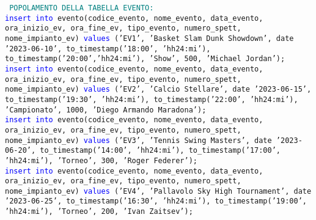 \documentclass{article}
\begin{document}
    \newpage
    \begin{flushleft}
        \texttt{
        \textcolor{teal}{POPOLAMENTO DELLA TABELLA EVENTO:} \\
        \hspace*{0.5em}\textcolor{blue}{insert into} evento(codice\_evento, nome\_evento, data\_evento, ora\_inizio\_ev, \hspace*{0.5em}ora\_fine\_ev, tipo\_evento, numero\_spett, nome\_impianto\_ev) \textcolor{blue}{values} ('EV1', 'Basket \hspace*{0.5em}Slam Dunk Showdown', date '2023-06-10', to\_timestamp('18:00', 'hh24:mi'), \hspace*{0.5em}to\_timestamp('20:00','hh24:mi'), 'Show', 500, 'Michael Jordan'); \\
        \vspace{2mm}
        \hspace*{0.5em}\textcolor{blue}{insert into} evento(codice\_evento, nome\_evento, data\_evento, ora\_inizio\_ev, \hspace*{0.5em}ora\_fine\_ev, tipo\_evento, numero\_spett, nome\_impianto\_ev) \textcolor{blue}{values} ('EV2', 'Calcio \hspace*{0.5em}Stellare', date '2023-06-15', to\_timestamp('19:30', 'hh24:mi'), \hspace*{0.5em}to\_timestamp('22:00', 'hh24:mi'), 'Campionato', 1000, 'Diego Armando Maradona'); \\
        \vspace{2mm}
        \hspace*{0.5em}\textcolor{blue}{insert into} evento(codice\_evento, nome\_evento, data\_evento, ora\_inizio\_ev, \hspace*{0.5em}ora\_fine\_ev, tipo\_evento, numero\_spett, nome\_impianto\_ev) \textcolor{blue}{values} ('EV3', 'Tennis \hspace*{0.5em}Swing Masters', date '2023-06-20', to\_timestamp('14:00', 'hh24:mi'), \hspace*{0.5em}to\_timestamp('17:00', 'hh24:mi'), 'Torneo', 300, 'Roger Federer'); \\
        \vspace{2mm}
        \hspace*{0.5em}\textcolor{blue}{insert into} evento(codice\_evento, nome\_evento, data\_evento, ora\_inizio\_ev, \hspace*{0.5em}ora\_fine\_ev, tipo\_evento, numero\_spett, nome\_impianto\_ev) \textcolor{blue}{values} ('EV4', \hspace*{0.5em}'Pallavolo Sky High Tournament', date '2023-06-25', to\_timestamp('16:30', \hspace*{0.5em}'hh24:mi'), to\_timestamp('19:00', 'hh24:mi'), 'Torneo', 200, 'Ivan Zaitsev'); \\
}
\end{flushleft}
\end{document}
